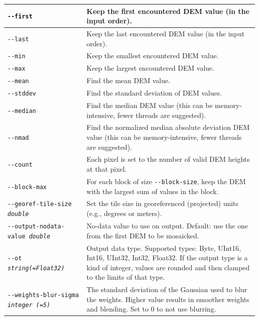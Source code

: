 \begin{longtable}{|l|p{10cm}|}
\texttt{-\/-first}
& Keep the first encountered DEM value (in the input order).
\\ \hline

\texttt{-\/-last}
& Keep the last encountered DEM value (in the input order).
\\ \hline

\texttt{-\/-min}
& Keep the smallest encountered DEM value.
\\ \hline

\texttt{-\/-max}
& Keep the largest encountered DEM value.
\\ \hline

\texttt{-\/-mean}
& Find the mean DEM value.
\\ \hline

\texttt{-\/-stddev}
& Find the standard deviation of DEM values.
\\ \hline

\texttt{-\/-median}
& Find the median DEM value (this can be memory-intensive, fewer threads are suggested).
\\ \hline

\texttt{-\/-nmad}
& Find the normalized median absolute deviation DEM value (this can be memory-intensive, fewer threads are suggested).
\\ \hline

\texttt{-\/-count}
& Each pixel is set to the number of valid DEM heights at that pixel.
\\ \hline

\texttt{-\/-block-max} & For each block of size \texttt{-\/-block-size}, keep the DEM with the largest sum of values in the block.\\ \hline

\texttt{-\/-georef-tile-size \textit{double}} &
Set the tile size in georeferenced (projected) units (e.g., degrees or meters).
\\ \hline
\texttt{-\/-output-nodata-value \textit{double}} &
No-data value to use on output. Default: use the one from the first DEM to be mosaicked.
\\ \hline

\texttt{-\/-ot \textit{string(=Float32)}} & Output data type. Supported types: Byte, UInt16, Int16, UInt32, Int32, Float32. If the output type is a kind of integer, values are rounded and then clamped to the limits of that type. \\ \hline

\texttt{-\/-weights-blur-sigma \textit{integer (=5)} } &
The standard deviation of the Gaussian used to blur the weights. Higher value results in smoother weights and blending. Set to 0 to not use blurring.
\\ \hline


\end{longtable}
